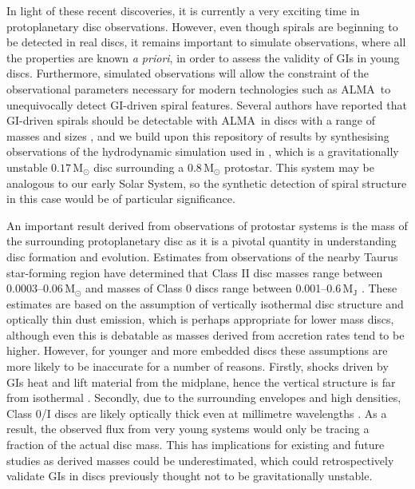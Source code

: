 \documentclass[fleqn,usenatbib]{mnras}
\newcommand{\alma}{ALMA}
\begin{document}
\smallskip

In light of these recent discoveries, it is currently a very exciting time in protoplanetary disc observations. However, even though spirals are beginning to be detected in real discs, it remains important to simulate observations, where all the properties are known {\textit{a priori}}, in order to assess the validity of GIs in young discs. Furthermore, simulated observations will allow the constraint of the observational parameters necessary for modern technologies such as \alma\ to unequivocally detect GI-driven spiral features. Several authors have reported that GI-driven spirals should be detectable with \alma\ in discs with a range of masses and sizes \citep[e.g.][]{Cossins&Lodato2010, Douglas&Caselli2013, Dipierro&Lodato2014}, and we build upon this repository of results by synthesising observations of the hydrodynamic simulation used in , which is a gravitationally unstable $0.17\,\mathrm{M}_{\odot}$ disc surrounding a $0.8\,\mathrm{M}_{\odot}$ protostar. This system may be analogous to our early Solar System, so the synthetic detection of spiral structure in this case would be of particular significance.

\smallskip

An important result derived from observations of protostar systems is the mass of the surrounding protoplanetary disc as it is a pivotal quantity in understanding disc formation and evolution. Estimates from observations of the nearby Taurus star-forming region have determined that Class II disc masses range between 0.0003--0.06\,$\mathrm{M}_{\odot}$ \citep{Andrews&Rosenfeld2013} and masses of Class 0 discs range between 0.001--0.6\,$\mathrm{M_J}$ \citep[see][Table 1]{Greaves&Rice2011}. These estimates are based on the assumption of vertically isothermal disc structure and optically thin dust emission, which is perhaps appropriate for lower mass discs, although even this is debatable as masses derived from accretion rates tend to be higher. However, for younger and more embedded discs these assumptions are more likely to be inaccurate for a number of reasons. Firstly, shocks driven by GIs heat and lift material from the midplane, hence the vertical structure is far from isothermal \citep[see][]{Boley&Durisen2006, Evans&Ilee2015}. Secondly, due to the surrounding envelopes and high densities, Class 0/I discs are likely optically thick even at millimetre wavelengths \citep[e.g.][]{Miotello&Testi2014}. As a result, the observed flux from very young systems would only be tracing a fraction of the actual disc mass. This has implications for existing and future studies as derived masses could be underestimated, which could retrospectively validate GIs in discs previously thought not to be gravitationally unstable.
\end{document}
